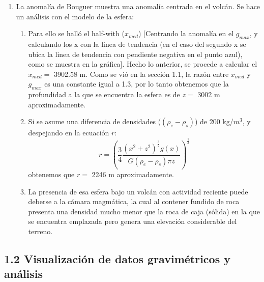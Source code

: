 \documentclass{article}
\begin{document}
\begin{enumerate}
\begin{figure}[H]
\end{figure}
\item La anomal\'ia de Bouguer muestra una anomal\'ia centrada en el volc\'an. Se hace un an\'alisis con el modelo de la esfera: 
	\begin{enumerate}
	\item Para ello se hall\'o el half-with ($x_{med}$) [Centrando la anomal\'ia en el $g_{max}$, y calculando los x con la linea de tendencia (en el caso del segundo x se ubica la linea de tendencia con pendiente negativa en el punto azul), como se muestra en la gr\'afica]. Hecho lo anterior, se procede a calcular el $x_{med}=$  3902.58 m.  Como se vi\'o en la secci\'on 1.1, la raz\'on entre $x_{med}$ y $g_{max}$ es una constante igual a 1.3, por lo tanto obtenemos que la profundidad a la que se encuentra la esfera es de $z =$ 3002 m aproximadamente. 
	\item Si se asume una diferencia de densidades ($(\rho_e-\rho_s)$) de 200 kg/$m^{3}$, y despejando en la ecuaci\'on $r$:
	\begin{equation*}
	r = (\frac{3}{4}\frac{(x^{2}+z^{2})^{\frac{3}{2}} g(x)}{G(\rho_e-\rho_s)\pi z})^{\frac{1}{3}}
	\end{equation*}
	obtenemos que $r=$ 2246 m aproximadamente.
	\item La presencia de esa esfera bajo un  volc\'an con actividad reciente puede deberse a la c\'amara magm\'atica, la cual al contener fundido de roca presenta una densidad mucho menor que la roca de caja (s\'olida) en la que se encuentra emplazada pero genera una elevaci\'on considerable del terreno. 
	\end{enumerate}
\end{enumerate}%

\subsection*{1.2 Visualizaci\'on de datos gravim\'etricos y an\'alisis}
\end{document}

